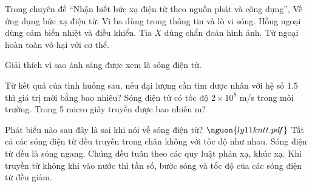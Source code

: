 \begin{ex}
Trong chuyên đề “Nhận biết bức xạ điện từ theo nguồn phát và công dụng”, Về ứng dụng bức xạ điện từ.
\choiceTF
{\True Vi ba dùng trong thông tin và lò vi sóng.}
{\True Hồng ngoại dùng cảm biến nhiệt và điều khiển.}
{\True Tia $X$ dùng chẩn đoán hình ảnh.}
{Tử ngoại hoàn toàn vô hại với cơ thể.}
\end{ex}

\begin{ex}
Giải thích vì sao ánh sáng được xem là sóng điện từ.
\choiceTF

\end{ex}

\begin{ex}
Từ kết quả của tình huống sau, nếu đại lượng cần tìm được nhân với hệ số 1.5 thì giá trị mới bằng bao nhiêu? Sóng điện từ có tốc độ $2\times10^8$ m/s trong môi trường. Trong 5 micro giây truyền được bao nhiêu m?
\end{ex}

\begin{ex}
Phát biểu nào sau đây là sai khi nói về sóng điện từ? $\nguon{ly11 kntt.pdf}$
\choice
{Tất cả các sóng điện từ đều truyền trong chân không với tốc độ như nhau.}
{Sóng điện từ đều là sóng ngang.}
{Chúng đều tuân theo các quy luật phản xạ, khúc xạ.}
{\True Khi truyền từ không khí vào nước thì tần số, bước sóng và tốc độ của các sóng điện từ đều giảm.}
\end{ex}

